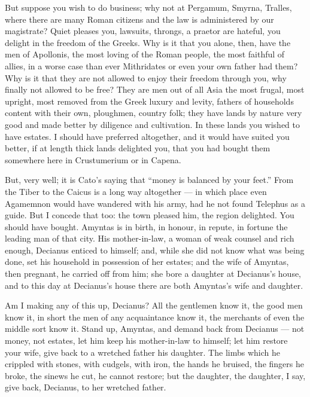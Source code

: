  But suppose you wish to do business; why not at Pergamum, Smyrna, Tralles, where there are many Roman citizens and the law is administered by our magistrate? Quiet pleases you, lawsuits, throngs, a praetor are hateful, you delight in the freedom of the Greeks. Why is it that you alone, then, have the men of Apollonis, the most loving of the Roman people, the most faithful of allies, in a worse case than ever Mithridates or even your own father had them? Why is it that they are not allowed to enjoy their freedom through you, why finally not allowed to be free? They are men out of all Asia the most frugal, most upright, most removed from the Greek luxury and levity, fathers of households content with their own, ploughmen, country folk; they have lands by nature very good and made better by diligence and cultivation. In these lands you wished to have estates. I should have preferred altogether, and it would have suited you better, if at length thick lands delighted you, that you had bought them somewhere here in Crustumerium or in Capena.

 But, very well; it is Cato's saying that ``money is balanced by your feet.'' From the Tiber to the Caicus is a long way altogether --- in which place even Agamemnon would have wandered with his army, had he not found Telephus as a guide. But I concede that too: the town pleased him, the region delighted. You should have bought. Amyntas is in birth, in honour, in repute, in fortune the leading man of that city. His mother-in-law, a woman of weak counsel and rich enough, Decianus enticed to himself; and, while she did not know what was being done, set his household in possession of her estates; and the wife of Amyntas, then pregnant, he carried off from him; she bore a daughter at Decianus's house, and to this day at Decianus's house there are both Amyntas's wife and daughter.

 Am I making any of this up, Decianus? All the gentlemen know it, the good men know it, in short the men of any acquaintance know it, the merchants of even the middle sort know it. Stand up, Amyntas, and demand back from Decianus --- not money, not estates, let him keep his mother-in-law to himself; let him restore your wife, give back to a wretched father his daughter. The limbs which he crippled with stones, with cudgels, with iron, the hands he bruised, the fingers he broke, the sinews he cut, he cannot restore; but the daughter, the daughter, I say, give back, Decianus, to her wretched father.

